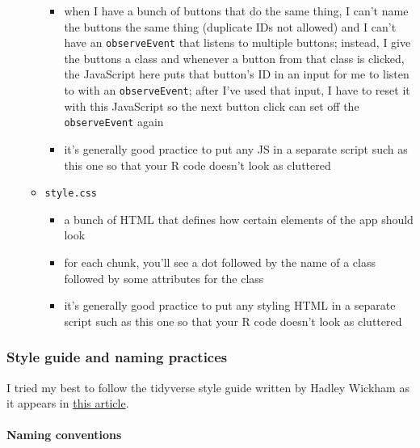 \documentclass[]{article}
\providecommand{\tightlist}{%
  \setlength{\itemsep}{0pt}\setlength{\parskip}{0pt}}
\let\oldparagraph\paragraph
\renewcommand{\paragraph}[1]{\oldparagraph{#1}\mbox{}}
\begin{document}
\begin{itemize}
\begin{itemize}
    \begin{itemize}
    \tightlist
    \item
      when I have a bunch of buttons that do the same thing, I can't
      name the buttons the same thing (duplicate IDs not allowed) and I
      can't have an \texttt{observeEvent} that listens to multiple
      buttons; instead, I give the buttons a class and whenever a button
      from that class is clicked, the JavaScript here puts that button's
      ID in an input for me to listen to with an \texttt{observeEvent};
      after I've used that input, I have to reset it with this
      JavaScript so the next button click can set off the
      \texttt{observeEvent} again
    \item
      it's generally good practice to put any JS in a separate script
      such as this one so that your R code doesn't look as cluttered
    \end{itemize}
  \item
    \texttt{style.css}

    \begin{itemize}
    \tightlist
    \item
      a bunch of HTML that defines how certain elements of the app
      should look
    \item
      for each chunk, you'll see a dot followed by the name of a class
      followed by some attributes for the class
    \item
      it's generally good practice to put any styling HTML in a separate
      script such as this one so that your R code doesn't look as
      cluttered
    \end{itemize}
  \end{itemize}
\end{itemize}

\hypertarget{style-guide}{\subsubsection{Style guide and naming
practices}\label{style-guide}}

I tried my best to follow the tidyverse style guide written by Hadley
Wickham as it appears in \href{https://style.tidyverse.org/}{this
article}.

\paragraph{Naming conventions}\label{naming-conventions}
\end{document}

